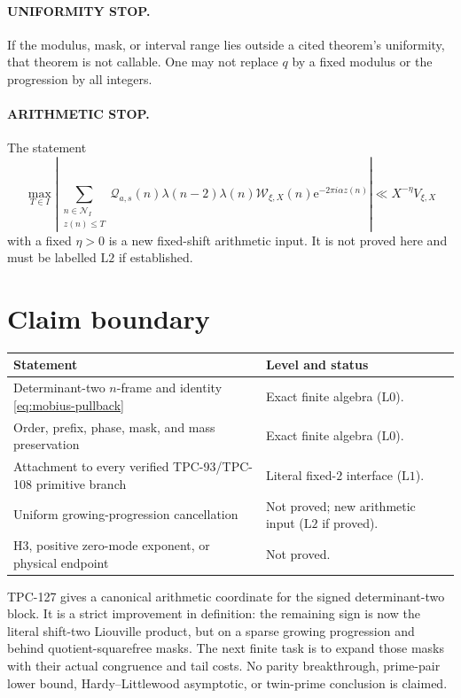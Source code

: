 \documentclass[11pt]{article}
\theoremstyle{definition}
\theoremstyle{remark}
\newcommand{\e}{\mathrm e}
\newcommand{\Lzero}{\mathrm{L0}}
\newcommand{\Lone}{\mathrm{L1}}
\newcommand{\Ltwo}{\mathrm{L2}}
\begin{document}
\paragraph{UNIFORMITY STOP.}
If the modulus, mask, or interval range lies outside a cited
theorem's uniformity, that theorem is not callable.  One may not
replace \(q\) by a fixed modulus or the progression by all integers.

\paragraph{ARITHMETIC STOP.}
The statement
\[
 \max_{T\in I}
 \left|
 \sum_{\substack{n\in\mathcal N_I\\z(n)\le T}}
 \mathcal Q_{a,s}(n)\lambda(n-2)\lambda(n)
 \mathcal W_{\xi,X}(n)\e^{-2\pi i\alpha z(n)}
 \right|
 \ll X^{-\eta}V_{\xi,X}
\]
with a fixed \(\eta>0\) is a new fixed-shift arithmetic input.  It is
not proved here and must be labelled \(\Ltwo\) if established.

\section{Claim boundary}

\begin{center}
\small
\begin{tabularx}{\textwidth}{@{}p{}X@{}}
\toprule
Statement & Level and status\\
\midrule
Determinant-two \(n\)-frame and identity
\eqref{eq:mobius-pullback}
& Exact finite algebra (\(\Lzero\)).\\
Order, prefix, phase, mask, and mass preservation
& Exact finite algebra (\(\Lzero\)).\\
Attachment to every verified TPC-93/TPC-108 primitive branch
& Literal fixed-\(2\) interface (\(\Lone\)).\\
Uniform growing-progression cancellation
& Not proved; new arithmetic input (\(\Ltwo\) if proved).\\
H3, positive zero-mode exponent, or physical endpoint
& Not proved.\\
\bottomrule
\end{tabularx}
\end{center}

TPC-127 gives a canonical arithmetic coordinate for the signed
determinant-two block.  It is a strict improvement in definition:
the remaining sign is now the literal shift-two Liouville product,
but on a sparse growing progression and behind quotient-squarefree
masks.  The next finite task is to expand those masks with their
actual congruence and tail costs.  No parity breakthrough,
prime-pair lower bound, Hardy--Littlewood asymptotic, or twin-prime
conclusion is claimed.

\begingroup
\footnotesize
\raggedright


\endgroup
\end{document}
